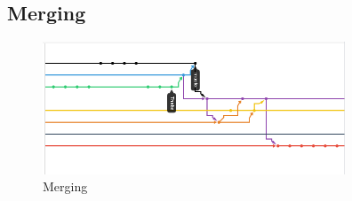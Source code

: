 \documentclass[english]{article}
\begin{document}
\subsection{Merging}

\begin{figure}[ht!]
\centering
\includegraphics[width=90mm]{merging.png}
\caption{Merging }
\end{figure}	

		
\end{document}
